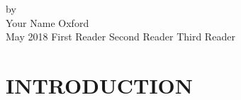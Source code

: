 \documentclass[reqno,12pt,oneside,letter]{report} %
\begin{document}
\setlength{\parindent}{0.5in}

{by \\
Your Name}	
{Oxford \\
May 2018}	%
{First Reader} %
{Second Reader} %
{Third Reader} %

\initializefrontsections



\makeatletter
\if@twoside \setcounter{page}{4} \else \setcounter{page}{1} \fi
\makeatother

\startabstractpage

\label{Abstract}

\startdedicationspage

\label{Dedication}

\startacknowledgementspage

\label{Acknowledgements}

%

\tableofcontents     %
\listoffigures       %

\startthechapters 

 \chapter{INTRODUCTION}
 \label{chap:Introduction}
 
\end{document}
